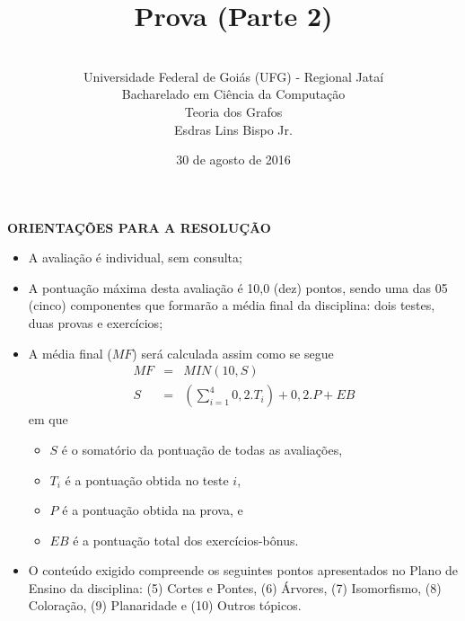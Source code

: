 \documentclass[12pt,a4paper,oneside]{article}
\author{\\Universidade Federal de Goiás (UFG) - Regional Jataí\\Bacharelado em Ciência da Computação \\Teoria dos Grafos \\Esdras Lins Bispo Jr.}
\title{\sc \huge Prova (Parte 2)}
\date{30 de agosto de 2016}
\begin{document}
\maketitle

{\bf ORIENTAÇÕES PARA A RESOLUÇÃO}

\footnotesize

\begin{itemize}
	\item A avaliação é individual, sem consulta;
	\item A pontuação máxima desta avaliação é 10,0 (dez) pontos, sendo uma das 05 (cinco) componentes que formarão a média final da disciplina: dois testes, duas provas e exercícios;
	\item A média final ($MF$) será calculada assim como se segue
	\begin{eqnarray}
		MF & = & MIN(10, S) \nonumber \\
		S & = & (\sum_{i=1}^{4} 0,2.T_i ) + 0,2.P  + EB \nonumber
	\end{eqnarray}
	em que 
	\begin{itemize}
		\item $S$ é o somatório da pontuação de todas as avaliações,
		\item $T_i$ é a pontuação obtida no teste $i$,
		\item $P$ é a pontuação obtida na prova, e
		\item $EB$ é a pontuação total dos exercícios-bônus.
	\end{itemize}
	\item O conteúdo exigido compreende os seguintes pontos apresentados no Plano de Ensino da disciplina: (5) Cortes e Pontes, (6) Árvores,  (7) Isomorfismo, (8) Coloração, (9) Planaridade e (10) Outros tópicos.
\end{itemize}

\begin{center}
\end{center}

\newpage

\normalsize
\end{document}
